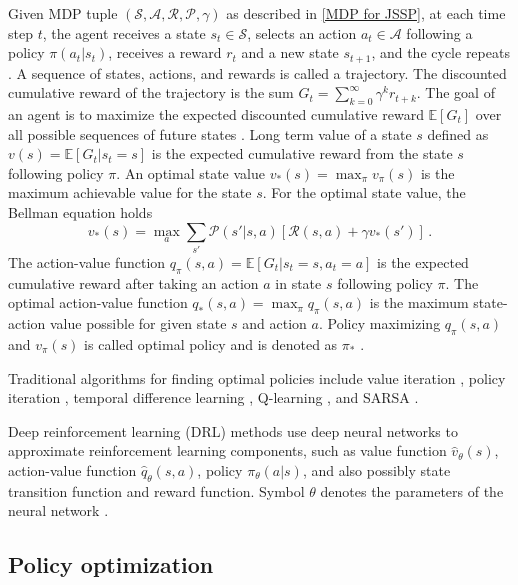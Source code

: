 Given MDP tuple $(\mathcal{S}, \mathcal{A}, \mathcal{R}, \mathcal{P}, \gamma)$ as described in \ref{MDP for JSSP}, at each time step $t$, the agent receives a state $s_t \in \mathcal{S}$, selects an action $a_t \in \mathcal{A}$ following a policy $\pi(a_t|s_t)$, receives a reward $r_t$ and a new state $s_{t+1}$, and the cycle repeats \cite{DBLP:journals/corr/Li17b}. A sequence of states, actions, and rewards is called a trajectory. The discounted cumulative reward of the trajectory is the sum $G_t = \sum_{k=0}^\infty \gamma^k r_{t+k}$. The goal of an agent is to maximize the expected discounted cumulative reward $\mathbb{E}[G_t]$ over all possible sequences of future states \cite{DBLP:journals/corr/Li17b}. Long term value of a state $s$ defined as $v(s) = \mathbb{E}\left [ G_t | s_t = s \right ]$ is the expected cumulative reward from the state $s$ following policy $\pi$. An optimal state value $v_*(s) = \max_\pi v_\pi(s)$ is the maximum achievable value for the state $s$. For the optimal state value, the Bellman equation holds \cite{DBLP:journals/corr/Li17b}
\begin{equation}
	v_*(s) = \max_a \sum_{s'} \mathcal{P} (s' | s,a)\left [ \mathcal{R}(s, a) + \gamma v_*(s') \right ] \, .
\end{equation}
The action-value function $q_\pi(s,a) = \mathbb{E} \left [ G_t | s_t=s, a_t=a\right ]$ is the expected cumulative reward after taking an action $a$ in state $s$ following policy $\pi$. The optimal action-value function $q_* (s,a) = \max_\pi q_\pi(s, a)$ is the maximum state-action value possible for given state $s$ and action $a$. Policy maximizing $q_\pi(s,a)$ and $v_\pi(s)$ is called optimal policy and is denoted as $\pi_*$ \cite{DBLP:journals/corr/Li17b}.
\par
Traditional algorithms for finding optimal policies include value iteration \cite{barto1989learning}, policy iteration \cite{Howard1960DynamicPA}, temporal difference learning \cite{tesauro1995temporal}, Q-learning \cite{watkins1992q}, and SARSA \cite{sarsa}.
\par
Deep reinforcement learning (DRL) methods use deep neural networks to approximate reinforcement learning components, such as value function $\hat{v}_\theta(s)$, action-value function $\hat{q}_\theta(s, a)$, policy $\pi_\theta(a|s)$, and also possibly state transition function and reward function. Symbol $\theta$ denotes the parameters of the neural network \cite{DBLP:journals/corr/Li17b}. 

\subsection{Policy optimization}


